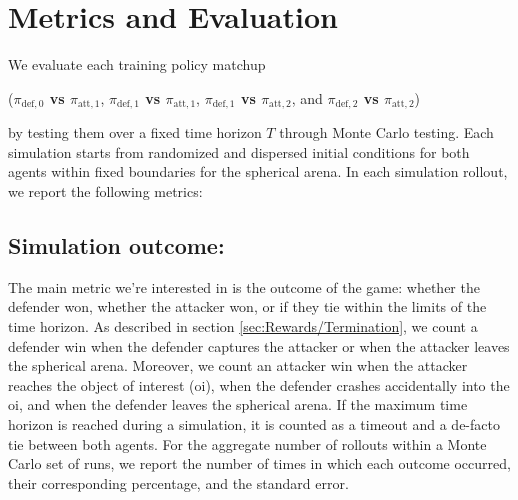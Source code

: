 \section{Metrics and Evaluation}
\label{sec:metrics-and-evaluation}

We evaluate each training policy matchup 

({\boldmath\textbf{$\pi_{\mathrm{def},0}$ vs $\pi_{\mathrm{att},1}$}}, {\boldmath\textbf{$\pi_{\mathrm{def},1}$ vs $\pi_{\mathrm{att},1}$}}, {\boldmath\textbf{$\pi_{\mathrm{def},1}$ vs $\pi_{\mathrm{att},2}$}}, and {\boldmath\textbf{$\pi_{\mathrm{def},2}$ vs $\pi_{\mathrm{att},2}$}})


by testing them over a fixed time horizon \(T\) through Monte Carlo testing. Each simulation starts from randomized and dispersed initial conditions for both agents within fixed boundaries for the spherical arena. In each simulation rollout, we report the following metrics:


\subsection*{Simulation outcome:}

The main metric we're interested in is the outcome of the game: whether the defender won, whether the attacker won, or if they tie within the limits of the time horizon. As described in section \ref{sec:Rewards/Termination}, we count a defender win when the defender captures the attacker or when the attacker leaves the spherical arena. Moreover, we count an attacker win when the attacker reaches the object of interest (\acs{oi}), when the defender crashes accidentally into the \acs{oi}, and when the defender leaves the spherical arena. If the maximum time horizon is reached during a simulation, it is counted as a timeout and a de-facto tie between both agents. For the aggregate number of rollouts within a Monte Carlo set of runs, we report the number of times in which each outcome occurred, their corresponding percentage, and the standard error.




